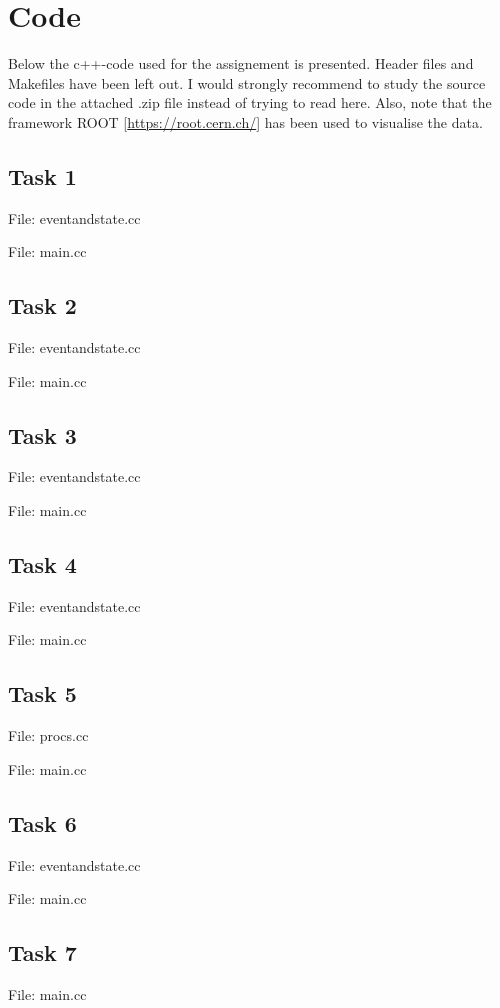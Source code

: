 \documentclass[]{article}
\begin{document}
\section*{Code}
Below the c++-code used for the assignement is presented. Header files and Makefiles have been left out. I would strongly recommend to study the source code in the attached .zip file instead of trying to read here.
Also, note that the framework ROOT [\url{https://root.cern.ch/}] has been used to visualise the data.

\subsection{Task 1}
{\large File: eventandstate.cc}


{\large File: main.cc}


\subsection{Task 2}
{\large File: eventandstate.cc}


{\large File: main.cc}


\subsection{Task 3}
{\large File: eventandstate.cc}


{\large File: main.cc}


\subsection{Task 4}
{\large File: eventandstate.cc}


{\large File: main.cc}


\subsection{Task 5}
{\large File: procs.cc}


{\large File: main.cc}


\subsection{Task 6}
{\large File: eventandstate.cc}


{\large File: main.cc}


\subsection{Task 7}
{\large File: main.cc}



 
\end{document}
